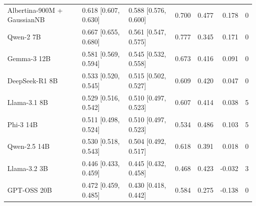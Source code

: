 \begin{table}[t]
\begin{tabular}{lllrrrr}
Albertina-900M + GaussianNB & 0.618 [0.607, 0.630] & 0.588 [0.576, 0.600] & 0.700 & 0.477 & 0.178 & 0 \\
Qwen-2 7B & 0.667 [0.655, 0.680] & 0.561 [0.547, 0.575] & 0.777 & 0.345 & 0.171 & 0 \\
Gemma-3 12B & 0.581 [0.569, 0.594] & 0.545 [0.532, 0.558] & 0.673 & 0.416 & 0.091 & 0 \\
DeepSeek-R1 8B & 0.533 [0.520, 0.545] & 0.515 [0.502, 0.527] & 0.609 & 0.420 & 0.047 & 0 \\
Llama-3.1 8B & 0.529 [0.516, 0.542] & 0.510 [0.497, 0.523] & 0.607 & 0.414 & 0.038 & 5 \\
Phi-3 14B & 0.511 [0.498, 0.524] & 0.510 [0.497, 0.523] & 0.534 & 0.486 & 0.103 & 5 \\
Qwen-2.5 14B & 0.530 [0.518, 0.543] & 0.504 [0.492, 0.517] & 0.618 & 0.391 & 0.018 & 0 \\
Llama-3.2 3B & 0.446 [0.433, 0.459] & 0.445 [0.432, 0.458] & 0.468 & 0.423 & -0.032 & 3 \\
GPT-OSS 20B & 0.472 [0.459, 0.485] & 0.430 [0.418, 0.442] & 0.584 & 0.275 & -0.138 & 0 \\
\bottomrule
\end{tabular}
\end{table}
